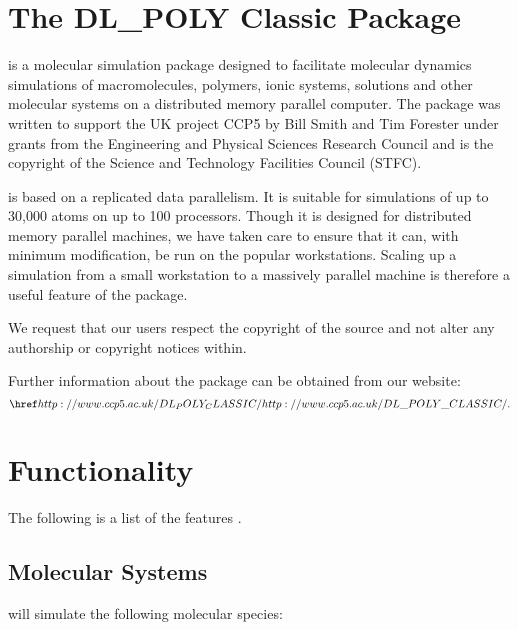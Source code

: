 
\section{The DL\_POLY Classic Package}

\D{} \cite{smith-96a} is a molecular simulation package
designed to facilitate molecular dynamics simulations of macromolecules,
polymers, ionic systems, solutions and other molecular systems on a
distributed memory parallel computer. The package was written to support the
UK project CCP5 by Bill Smith and Tim Forester \cite{smith-87a}
under grants from the Engineering and Physical Sciences Research Council and
is the copyright of the Science and Technology Facilities Council (STFC).

\D{} is based on a replicated data parallelism. It is suitable for simulations
of up to 30,000 atoms on up to 100 processors.  Though it is designed for
distributed memory parallel machines, we have taken care to ensure that it
can, with minimum modification, be run on the popular workstations. Scaling up
a simulation from a small workstation to a massively parallel machine is
therefore a useful feature of the package.

We request that our users respect the copyright of the \D{} source and not alter
any authorship or copyright notices within. 

Further information about the \D{} package can be obtained from
our website: \[\WEB{}.\index{WWW}\]

\section{Functionality}

The following is a list of the features \D{}.

\subsection{Molecular Systems}

\D{} will simulate the following molecular species:

